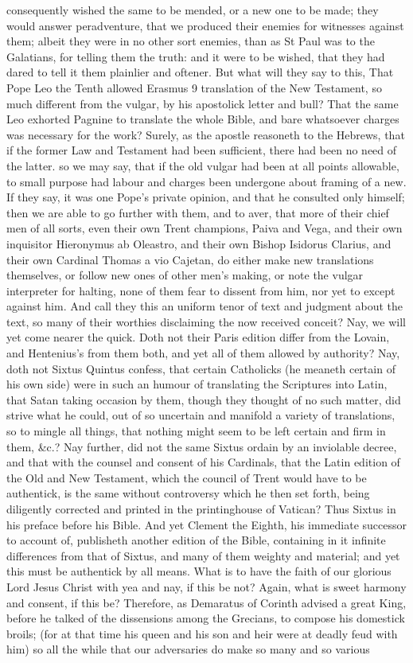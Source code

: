consequently wished the same to be mended, or a new one to be made; they would answer peradventure, that we produced their enemies for witnesses against them; albeit they were in no other sort enemies, than as St Paul was to the Galatians, for telling them the truth: and it were to be wished, that they had dared to tell it them plainlier and oftener. But what will they say to this, That Pope Leo the Tenth allowed Erasmus 9 translation of the New Testament, so much different from the vulgar, by his apostolick letter and bull? That the same Leo exhorted Pagnine to translate the whole Bible, and bare whatsoever charges was necessary for the work? Surely, as the apostle reasoneth to the Hebrews, that if the former Law and Testament had been sufficient, there had been no need of the latter. so we may say, that if the old vulgar had been at all points allowable, to small purpose had labour and charges been undergone about framing of a new. If they say, it was one Pope's private opinion, and that he consulted only himself; then we are able to go further with them, and to aver, that more of their chief men of all sorts, even their own Trent champions, Paiva and Vega, and their own inquisitor Hieronymus ab Oleastro, and their own Bishop Isidorus Clarius, and their own Cardinal Thomas a vio Cajetan, do either make new translations themselves, or follow new ones of other men's making, or note the vulgar interpreter for halting, none of them fear to dissent from him, nor yet to except against him. And call they this an uniform tenor of text and judgment about the text, so many of their worthies disclaiming the now received conceit? Nay, we will yet come nearer the quick. Doth not their Paris edition differ from the Lovain, and Hentenius's from them both, and yet all of them allowed by authority? Nay, doth not Sixtus Quintus confess, that certain Catholicks (he meaneth certain of his own side) were in such an humour of translating the Scriptures into Latin, that Satan taking occasion by them, though they thought of no such matter, did strive what he could, out of so uncertain and manifold a variety of translations, so to mingle all things, that nothing might seem to be left certain and firm in them, &c.? Nay further, did not the same Sixtus ordain by an inviolable decree, and that with the counsel and consent of his Cardinals, that the Latin edition of the Old and New Testament, which the council of Trent would have to be authentick, is the same without controversy which he then set forth, being diligently corrected and printed in the printinghouse of Vatican? Thus Sixtus in his preface before his Bible. And yet Clement the Eighth, his immediate successor to account of, publisheth another edition of the Bible, containing in it infinite differences from that of Sixtus, and many of them weighty and material; and yet this must be authentick by all means. What is to have the faith of our glorious Lord Jesus Christ with yea and nay, if this be not? Again, what is sweet harmony and consent, if this be? Therefore, as Demaratus of Corinth advised a great King, before he talked of the dissensions among the Grecians, to compose his domestick broils; (for at that time his queen and his son and heir were at deadly feud with him) so all the while that our adversaries do make so many and so various 